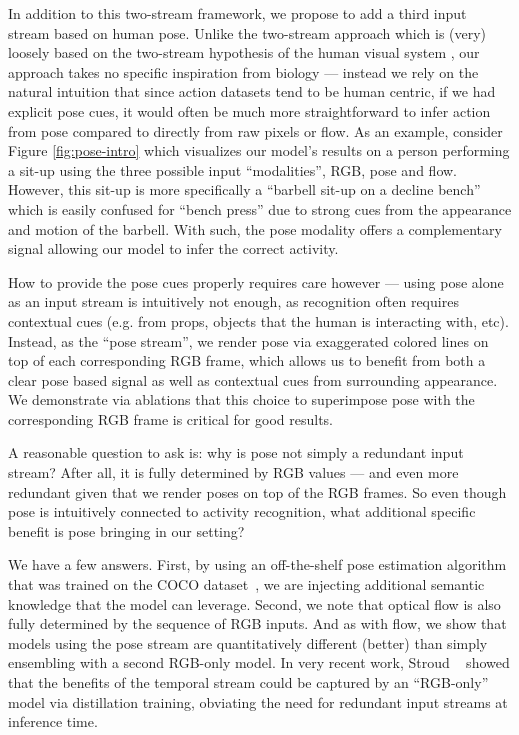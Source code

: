 \documentclass[10pt,twocolumn,letterpaper]{article}
\begin{document}
In addition to this two-stream framework, we propose to add a third input stream based on human pose.  Unlike the two-stream approach which is (very) loosely based on the two-stream hypothesis of the human visual system \cite{goodale1992separate}, our approach takes no specific inspiration from biology --- instead we rely on the natural intuition that since action datasets tend to be human centric, if we had explicit pose cues, it would often be much more straightforward to infer action from pose compared to directly from raw pixels or flow.  As an example, consider Figure \ref{fig:pose-intro} which visualizes our model’s results on a person performing a sit-up using the three possible input “modalities”, RGB, pose and flow.  However, this sit-up is more specifically a “barbell sit-up on a decline bench” which is easily confused for “bench press” due to strong cues from the appearance and motion of the barbell. With such, the pose modality offers a complementary signal allowing our model to infer the correct activity.

How to provide the pose cues properly requires care however --- using pose alone as an input stream is intuitively not enough, as recognition often requires contextual cues (e.g. from props, objects that the human is interacting with, etc).  Instead, as the “pose stream”, we render pose via exaggerated colored lines on top of each corresponding RGB frame, which allows us to benefit from both a clear pose based signal as well as contextual cues from surrounding appearance.  We demonstrate via ablations that this choice to superimpose pose with the corresponding RGB frame is critical for good results.

A reasonable question to ask is: why is pose not simply a redundant input stream? After all, it is fully determined by RGB values --- and even more redundant given that we render poses on top of the RGB frames. So even though pose is intuitively connected to activity recognition, what additional specific benefit is pose bringing in our setting?  

We have a few answers.  First, by using an off-the-shelf pose estimation algorithm that was trained on the COCO dataset~\cite{lin2014microsoft}, we are injecting additional semantic knowledge that the model can leverage.  Second, we note that optical flow is also fully determined by the sequence of RGB inputs. And as with flow, we show that models using the pose stream are quantitatively different (better) than simply ensembling with a second RGB-only model.  In very recent work, Stroud \etal~\cite{stroud2020d3d} showed that the benefits of the temporal stream could be captured by an “RGB-only” model via distillation training,  obviating the need for redundant input streams at inference time.  
\end{document}
